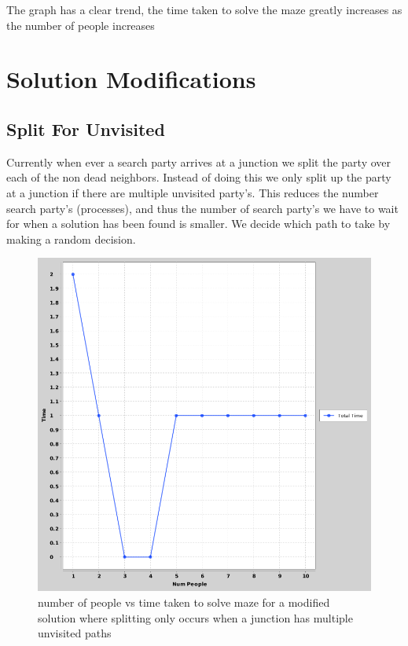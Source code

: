 \documentclass[a4paper, 12pt]{article}
\begin{document}
		The graph has a clear trend, the time taken to solve the maze greatly increases as the number of people increases
  	

	\section{Solution Modifications}
		\subsection{Split For Unvisited}
			Currently when ever a search party arrives at a junction we split the party over each of the non dead neighbors. Instead of doing this we only split up the party at a junction if there are multiple unvisited party's. This reduces the number search party's (processes), and thus the number of search party's we have to wait for when a solution has been found is smaller. We decide which path to take by making a random decision.
			
			\begin{figure}[H]
				\centering
				\includegraphics[scale=0.4]{numpeople-vs-time(split-for-unvisited)}
				\caption{number of people vs time taken to solve maze for a modified solution where splitting only occurs when a junction has multiple unvisited paths}
			\end{figure}
			
\end{document}
